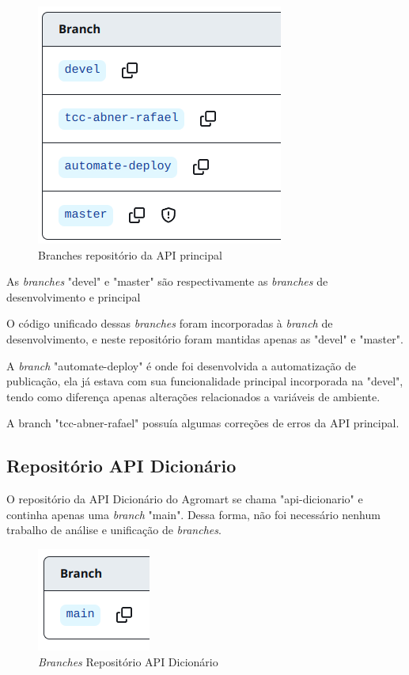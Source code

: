\begin{figure}[h]
	\centering
	\includegraphics[keepaspectratio=true,scale=0.5]{figuras/branches_api.png}
	\caption{Branches repositório da API principal}
\end{figure}

As \textit{branches} "devel" e "master" são respectivamente as \textit{branches} de desenvolvimento e principal

O código unificado dessas \textit{branches} foram incorporadas à \textit{branch} de desenvolvimento, e neste repositório foram mantidas apenas as "devel" e "master".

A \textit{branch} "automate-deploy" é onde foi desenvolvida a automatização de publicação, ela já estava com sua funcionalidade principal incorporada na "devel", tendo como diferença apenas alterações relacionados a variáveis de ambiente. 

A branch "tcc-abner-rafael" possuía algumas correções de erros da API principal.


\subsection{Repositório API Dicionário}
O repositório da API Dicionário do Agromart se chama "api-dicionario" e continha apenas uma \textit{branch} "main". Dessa forma, não foi necessário nenhum trabalho de análise e unificação de \textit{branches}.

\begin{figure}[h]
	\centering
	\includegraphics[keepaspectratio=true,scale=0.5]{figuras/branches_api_dicionario.png}
	\caption{\textit{Branches} Repositório API Dicionário}
\end{figure}


